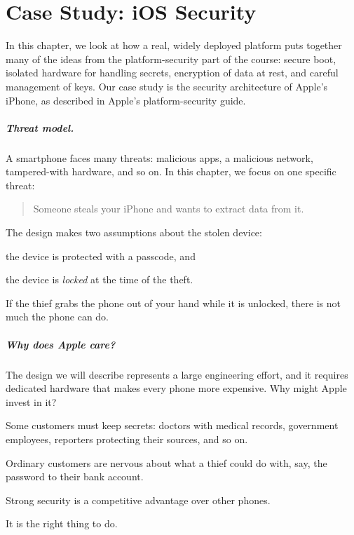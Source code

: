 \chapter{Case Study: iOS Security}
\label{chap:ios}

In this chapter, we look at how a real, widely deployed platform puts
together many of the ideas from the platform-security part of the
course: secure boot, isolated hardware for handling secrets, encryption
of data at rest, and careful management of keys.
Our case study is the security architecture of Apple's iPhone, as
described in Apple's platform-security guide.\autocite{apple:platform-security}

\paragraph{Threat model.}
A smartphone faces many threats: malicious apps, a malicious network,
tampered-with hardware, and so on.
In this chapter, we focus on one specific threat:
\begin{quote}
  Someone steals your iPhone and wants to extract data from it.
\end{quote}
The design makes two assumptions about the stolen device:
\begin{compactitem}
  \item the device is protected with a passcode, and
  \item the device is \emph{locked} at the time of the theft.
\end{compactitem}
If the thief grabs the phone out of your hand while it is unlocked,
there is not much the phone can do.

\paragraph{Why does Apple care?}
The design we will describe represents a large engineering effort, and
it requires dedicated hardware that makes every phone more expensive.
Why might Apple invest in it?
\begin{compactitem}
  \item Some customers must keep secrets: doctors with medical records,
        government employees, reporters protecting their sources, and so on.
  \item Ordinary customers are nervous about what a thief could do with,
        say, the password to their bank account.
  \item Strong security is a competitive advantage over other phones.
  \item It is the right thing to do.
\end{compactitem}

